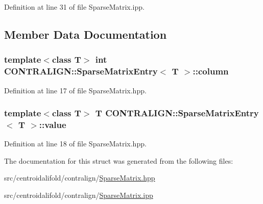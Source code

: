 Definition at line 31 of file Sparse\+Matrix.\+ipp.



\subsection{Member Data Documentation}
\hypertarget{struct_c_o_n_t_r_a_l_i_g_n_1_1_sparse_matrix_entry_a9e09b06b482fcef5e44223207aee3bea}{
\subsubsection[{column}]{\setlength{\rightskip}{0pt plus 5cm}template$<$class T$>$ int {\bf C\+O\+N\+T\+R\+A\+L\+I\+G\+N\+::\+Sparse\+Matrix\+Entry}$<$ T $>$\+::column}}\label{struct_c_o_n_t_r_a_l_i_g_n_1_1_sparse_matrix_entry_a9e09b06b482fcef5e44223207aee3bea}


Definition at line 17 of file Sparse\+Matrix.\+hpp.

\hypertarget{struct_c_o_n_t_r_a_l_i_g_n_1_1_sparse_matrix_entry_a61180da626bf3c9f525b5e6ce0af14b8}{
\subsubsection[{value}]{\setlength{\rightskip}{0pt plus 5cm}template$<$class T$>$ T {\bf C\+O\+N\+T\+R\+A\+L\+I\+G\+N\+::\+Sparse\+Matrix\+Entry}$<$ T $>$\+::value}}\label{struct_c_o_n_t_r_a_l_i_g_n_1_1_sparse_matrix_entry_a61180da626bf3c9f525b5e6ce0af14b8}


Definition at line 18 of file Sparse\+Matrix.\+hpp.



The documentation for this struct was generated from the following files\+:\begin{DoxyCompactItemize}
\item 
src/centroidalifold/contralign/\hyperlink{_sparse_matrix_8hpp}{Sparse\+Matrix.\+hpp}\item 
src/centroidalifold/contralign/\hyperlink{_sparse_matrix_8ipp}{Sparse\+Matrix.\+ipp}\end{DoxyCompactItemize}
